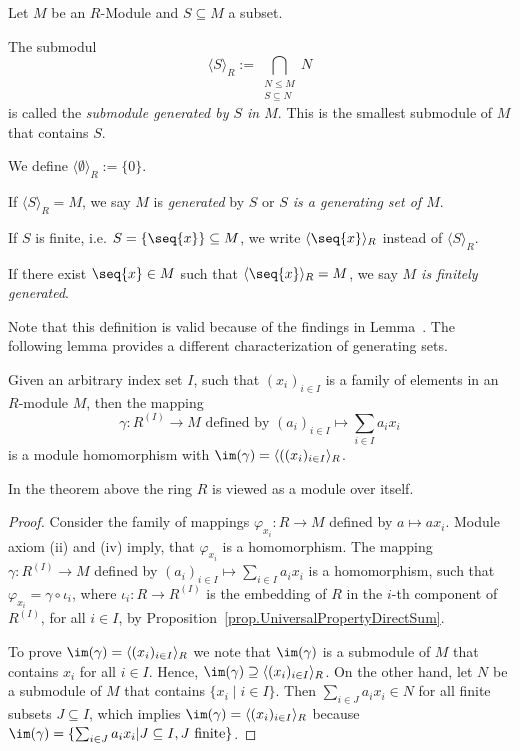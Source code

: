 \begin{defin}
Let $M$ be an $R$-Module and $S\subseteq M$ a subset.
\begin{compactenum}
\item The submodul \begin{equation*}
\langle S \rangle_R := \bigcap\limits_{\substack{N\leq M\\S\subseteq N}}N
\end{equation*}  is called the \emph{submodule generated by $S$ in $M$}. This is the smallest submodule of $M$ that contains $S$.
\item We define $\langle\emptyset\rangle_R:=\lbrace 0\rbrace$.
\item If $\langle S \rangle_R=M$, we say $M$ is \emph{generated} by $S$ or \emph{$S$ is a generating set of $M$}.
\item If $S$ is finite, i.e. $S=\lbrace \seq{x}\rbrace\subseteq M$, we write $\langle\seq{x}\rangle_R$ instead of $\langle S \rangle_R$.
\item If there exist $\seq{x}\in M$ such that $\langle\seq{x}\rangle_R=M$, we say \emph{$M$ is finitely generated}.
\end{compactenum}
\end{defin}
Note that this definition is valid because of the findings in Lemma~. The following lemma provides a different characterization of generating sets.

\begin{theo}\label{lem.Generating Set Homomorphism}
Given an arbitrary index set $I$, such that $(x_i)_{i\in I}$ is a family of elements in an $R$-module $M$, then the mapping
\begin{equation*}
\gamma\colon R^{(I)}\to M \text{ defined by } (a_i)_{i\in I}\mapsto \sum_{i\in I} a_i x_i
\end{equation*}
is a module homomorphism with $\im(\gamma)=\langle ((x_i)_{i\in I}\rangle_R$.
\end{theo}
In the theorem above the ring $R$ is viewed as a module over itself.
\begin{proof}
Consider the family of mappings $\varphi_{x_i}\colon R\to M$ defined by $a\mapsto ax_i$. Module axiom (ii) and (iv) imply, that $\varphi_{x_i}$ is a homomorphism. The mapping $\gamma\colon R^{(I)}\to M$ defined by $(a_i)_{i\in I}\mapsto\sum_{i\in I} a_ix_i$ is a homomorphism, such that $\varphi_{x_i}=\gamma\circ\iota_i$, where $\iota_i\colon R\to R^{(I)}$ is the embedding of $R$ in the $i$-th component of $R^{(I)}$, for all $i\in I$, by Proposition~\ref{prop.UniversalPropertyDirectSum}.

To prove $\im(\gamma)=\langle (x_i)_{i\in I}\rangle_R$ we note that $\im(\gamma)$ is a submodule of $M$ that contains $x_i$ for all $i\in I$. Hence, $\im(\gamma)\supseteq\langle (x_i)_{i\in I}\rangle_R$. On the other hand, let $N$ be a submodule of $M$ that contains $\lbrace x_i\mid i\in I\rbrace$. Then $\sum_{i\in J} a_i x_i\in N$ for all finite subsets $J\subseteq I$, which implies $\im(\gamma)=\langle (x_i)_{i\in I}\rangle_R$ because $\im(\gamma)=\lbrace\sum_{i\in J} a_i x_i| J\subseteq I, J \text{ finite}\rbrace$.
\end{proof}

